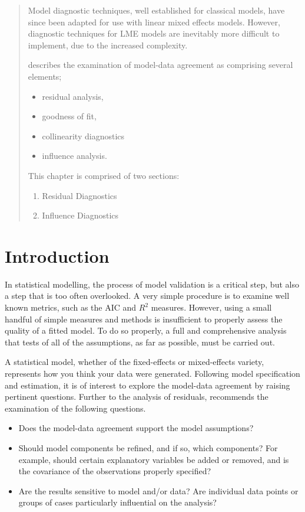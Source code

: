 \begin{abstract}
Model diagnostic techniques, well established for classical models, have since been adapted for use with linear mixed effects models. However, diagnostic techniques for LME models are inevitably more difficult to implement, due to the increased complexity. \\ \bigskip


\citet{schab} describes the examination of model-data agreement as comprising several elements; \begin{itemize}
		\item residual analysis, 
		\item goodness of fit, 
		\item collinearity diagnostics
		\item influence analysis.
	\end{itemize} 
	
This chapter is comprised of two sections:
\begin{enumerate}
	\item Residual Diagnostics
	\item Influence Diagnostics
\end{enumerate}
\end{abstract}

\newpage
\section{Introduction}
In statistical modelling, the process of model validation is a critical step, but also a step that is too often overlooked. A very simple procedure is to examine well known
metrics, such as the AIC and $R^2$ measures. However, using a small handful of simple measures and methods is insufficient to properly assess the quality of a fitted model. To do so properly, a full and comprehensive
analysis that tests of all of the assumptions, as far as possible, must be carried out. 

A statistical model, whether of the fixed-effects or mixed-effects variety, represents how you think your data were generated. Following model specification and estimation, it is of interest to explore the model-data
agreement by raising pertinent questions. Further to the analysis of residuals, \citet{schab} recommends the examination of the following questions.
\begin{itemize}
	\item Does the model-data agreement support the model assumptions?
	\item Should model components be refined, and if so, which components? For example, should certain explanatory variables
	be added or removed, and is the covariance of the observations properly specified?
	\item Are the results sensitive to model and/or data? Are individual data points or groups of cases particularly
	influential on the analysis?
\end{itemize}
\newpage

